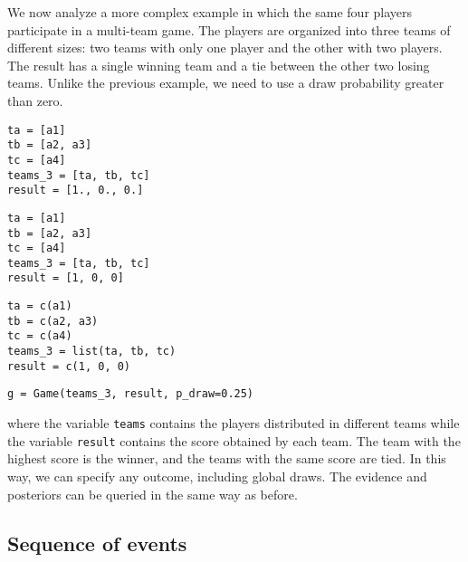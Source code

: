 \documentclass[article]{jss}
\begin{document}
We now analyze a more complex example in which the same four players participate in a multi-team game. 
The players are organized into three teams of different sizes: two teams with only one player and the other with two players. 
The result has a single winning team and a tie between the other two losing teams. 
Unlike the previous example, we need to use a draw probability greater than zero. 
%
\begin{paracol}{3}
\begin{lstlisting}[backgroundcolor=\color{julia!60}, belowskip=-0.77 \baselineskip]
ta = [a1]
tb = [a2, a3]
tc = [a4]
teams_3 = [ta, tb, tc]
result = [1., 0., 0.]
\end{lstlisting}
  \switchcolumn
\begin{lstlisting}[backgroundcolor=\color{python!60}, belowskip=-0.77 \baselineskip]
ta = [a1]
tb = [a2, a3]
tc = [a4]
teams_3 = [ta, tb, tc]
result = [1, 0, 0]
\end{lstlisting}
   \switchcolumn
\begin{lstlisting}[backgroundcolor=\color{r!50}, belowskip=-0.77 \baselineskip]
ta = c(a1)
tb = c(a2, a3)
tc = c(a4)
teams_3 = list(ta, tb, tc)
result = c(1, 0, 0)
\end{lstlisting}  
\end{paracol}
\begin{lstlisting}[captionpos=b,backgroundcolor=\color{all},label=lst:multiple_team_game,caption={Game with multiple teams of different sizes and the possibility of tie.},belowskip=0cm]
g = Game(teams_3, result, p_draw=0.25)
\end{lstlisting}
%
where the variable \texttt{teams} contains the players distributed in different teams while the variable \texttt{result} contains the score obtained by each team. 
The team with the highest score is the winner, and the teams with the same score are tied. 
In this way, we can specify any outcome, including global draws. 
The evidence and posteriors can be queried in the same way as before. 

\subsection{Sequence of events} \label{sec:sequence_of_events}
\end{document}
